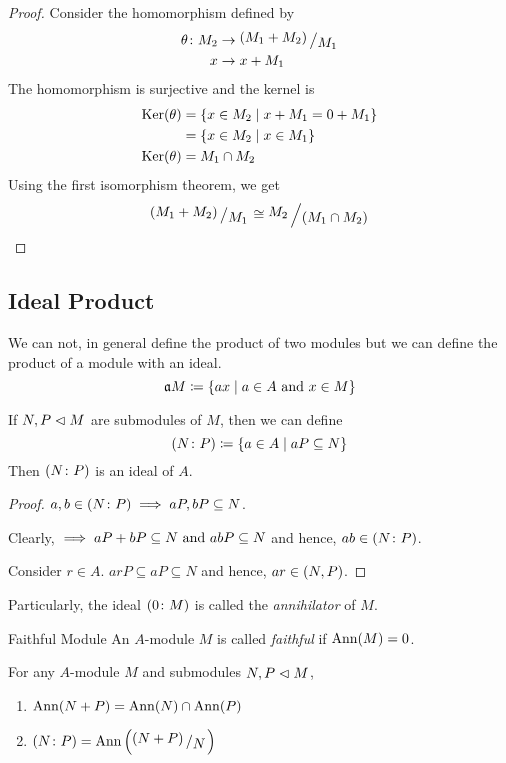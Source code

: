 \begin{proof}
	Consider the homomorphism defined by
	\begin{align*}
		\theta \colon M_2 &\to \bigslant{(M_1 + M_2)}{M_1} \\
		x &\to x + M_1
	\end{align*}
	The homomorphism is surjective and the kernel is
	\begin{align*}
		\operatorname{Ker}(\theta) &= \left\{ x \in M_2 \mid x + M_1 = 0 + M_1 \right\} \\
		&= \left\{ x \in M_2 \mid x \in M_1 \right\} \\
		\operatorname{Ker}(\theta) &= M_1 \cap M_2
	\end{align*}
	Using the first isomorphism theorem, we get
	\[
		\bigslant{\brak{M_1 + M_2}}{M_1} \cong
		\bigslant{M_2}{\brak{M_1 \cap M_2}} \qedhere
	\]
\end{proof}


\subsection{Ideal Product}
We can not, in general define the product of two modules but we can define
the product of a module with an ideal.
\[
	\mathfrak{a} M \coloneqq \left\{ a x \mid a \in A \text{ and } x \in M \right\}
\]

\begin{claim}{}{}
	If \(N, P \vartriangleleft M\) are submodules of \(M\), then we can define
	\[
		\left( N \colon P \right) \coloneqq \left\{ a \in A \mid aP \subseteq N \right\}
	\]
	Then \(\left( N \colon P \right)\) is an ideal of \(A\).
\end{claim}

\begin{proof}
	\(a, b \in \left( N \colon P \right) \implies aP, bP \subseteq N\).

	Clearly, \(\implies aP + bP \subseteq N \text{ and } abP \subseteq N\) and hence,
	\(ab \in \left( N \colon P \right)\).

	Consider \( r \in A \).
	\( arP \subseteq aP \subseteq N\) and hence, \(ar \in \left( N, P \right)\).
\end{proof}

Particularly, the ideal \(\left( 0 \colon M \right)\)
is called the \emph{annihilator} of \(M\).

\begin{defn}{Faithful Module}{}
	An \(A\)-module \(M\) is called \emph{faithful} if
	\(\operatorname{Ann}(M) = 0\).
\end{defn}

\begin{proposition}{}{}
	For any \(A\)-module \(M\) and submodules \(N, P \vartriangleleft M\),
	\begin{enumerate}
		\item \(\operatorname{Ann}(N+P) = \operatorname{Ann}(N) \cap \operatorname{Ann}(P)\)
		\item \(\brak{N \colon P} = \Ann\brak{\bigslant{\brak{N+P}}{N}}\)
	\end{enumerate}
\end{proposition}

